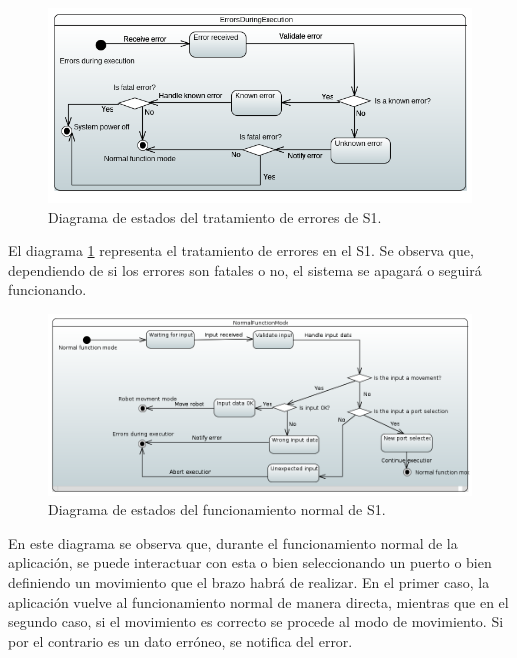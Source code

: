 \begin{figure}[H]
    \centering
    \includegraphics[width=\linewidth]{pictures/S1ErrorsDuringExecution.PNG}
    \caption{Diagrama de estados del tratamiento de errores de \ac{S1}.}
    \label{fig:diagrama_estados_error_s1}
\end{figure}

El diagrama \ref{fig:diagrama_estados_error_s1} representa el tratamiento de errores en el \ac{S1}.
Se observa que, dependiendo de si los errores son fatales o no, el sistema se apagará o seguirá funcionando.

\begin{figure}[H]
    \centering
    \includegraphics[width=\linewidth]{pictures/S1NormalFunctionMode.PNG}
    \caption{Diagrama de estados del funcionamiento normal de \ac{S1}.}
    \label{fig:diagrama_estados_normal_s1}
\end{figure}

En este diagrama se observa que, durante el funcionamiento normal de la aplicación, se puede interactuar con esta o bien seleccionando un puerto o bien definiendo un movimiento que el brazo habrá de realizar.
En el primer caso, la aplicación vuelve al funcionamiento normal de manera directa, mientras que en el segundo caso, si el movimiento es correcto se procede al modo de movimiento. Si por el contrario es un dato erróneo, se notifica del error.

